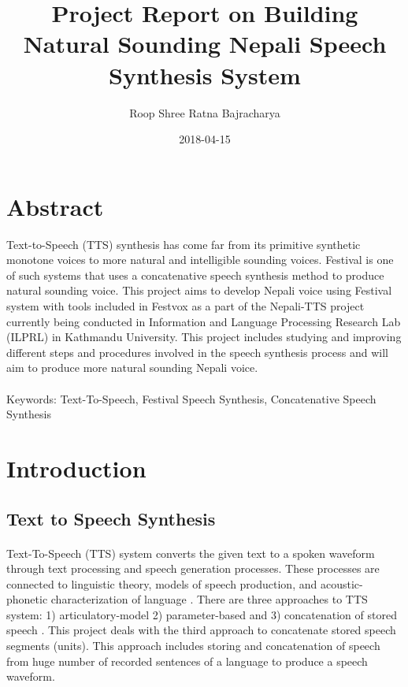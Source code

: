 \documentclass{article}
\title{Project Report on Building Natural Sounding Nepali Speech Synthesis System}
\date{2018-04-15}
\author{Roop Shree Ratna Bajracharya}
\begin{document}
	
	\maketitle
	\newpage

	\tableofcontents
	\newpage

	
	\section{Abstract}
		Text-to-Speech (TTS) synthesis has come far from its primitive synthetic monotone voices to more natural and intelligible sounding voices. Festival is one of such systems that uses a concatenative speech synthesis method to produce natural sounding voice. This project aims to develop Nepali voice using Festival system with tools included in Festvox as a part of the Nepali-TTS project currently being conducted in Information and Language Processing Research Lab (ILPRL) in Kathmandu University. This project includes studying and improving different steps and procedures involved in the speech synthesis process and will aim to produce more natural sounding Nepali voice.
		\paragraph{}
		Keywords: Text-To-Speech, Festival Speech Synthesis, Concatenative Speech Synthesis
	\newpage
	
	\section{Introduction}
		\subsection{Text to Speech Synthesis}
		\paragraph{}
		Text-To-Speech (TTS) system converts the given text to a spoken waveform through text processing and speech generation processes. These processes are connected to linguistic theory, models of speech production, and acoustic-phonetic characterization of language \cite{ReviewOfTTS:1}. There are three approaches to TTS system: 1) articulatory-model 2) parameter-based  and 3) concatenation of stored speech \cite{ReviewOfTTS:1}. This project deals with the third approach to concatenate stored speech segments (units). This approach includes storing and concatenation of speech from huge number of recorded sentences of a language to produce a speech waveform. 
	
\end{document}
